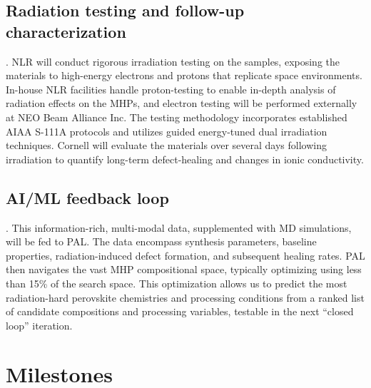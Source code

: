 \documentclass[pgs]{DOE}
\newcommand{\mnote}[1]{{\marginpar{\color{red} #1}}}
\renewcommand{\mnote}[1]{}
\begin{document}
\subsection{Radiation testing and follow-up characterization}.  
NLR will conduct rigorous irradiation testing on the samples, 
exposing the materials to high-energy electrons and protons that replicate space environments. In-house NLR facilities handle proton-testing to enable in-depth analysis of radiation effects on the MHPs, and electron testing will be performed externally at NEO Beam Alliance Inc. The testing methodology incorporates established AIAA S-111A protocols \cite{AIAA2014, hanAdvancingPerovskiteSolar2025} and utilizes guided energy-tuned dual irradiation techniques. \cite{kirmaniUnravelingRadiationDamage2024, kirmaniCountdownPerovskiteSpace2022}
Cornell will evaluate the materials over several days following irradiation to quantify long-term defect-healing and changes in ionic conductivity.

\subsection{AI/ML feedback loop}.  
This information-rich, multi-modal data, supplemented with MD simulations, will be fed to PAL. 
The data encompass synthesis parameters, baseline properties, radiation-induced defect formation, and subsequent healing rates. PAL then navigates the vast MHP compositional space, typically optimizing using less than 15\% of the search space.
This optimization allows us to predict the most radiation-hard perovskite chemistries and processing conditions from a ranked list of candidate compositions and processing variables, testable in the next ``closed loop'' iteration.


\section{Milestones}
\mnote{1 page}
%
% 


\end{document}
